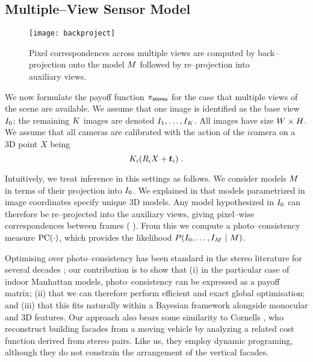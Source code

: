 \subsection{Multiple--View Sensor Model}

\begin{figure}[tb]
  \centering \texttt{[image: backproject]}
  \caption{Pixel correspondences across multiple views are computed by
    back--projection onto the model $\Scene$ followed by re--projection into
    auxiliary views.}
  \label{fig:backproject}
\end{figure}
We now formulate the payoff function $\StereoPayoff$ for the case that
multiple views of the scene are available. We assume that one
image is identified as the base view $\Image_0$; the remaining
$\NumViews$ images are denoted
$\Image_1,\ldots,\Image_{\NumViews}$. All images have size
$\Width\times\Height$. We assume that all cameras are calibrated with
the action of the $i$\th camera on a 3D point $X$ being
\begin{equation}
  \CamMatrix_i (\CamR_i X + \CamTr_i) ~.
\end{equation}

Intuitively, we treat inference in this settings as follows. We
consider models $\Scene$ in terms of their projection into
$\Image_0$. We explained in  that models parametrized in
image coordinates specify unique 3D models. Any model hypothesized in
$\Image_0$ can therefore be re--projected into the auxiliary views,
giving pixel--wise correspondences between frames (\cf
{}). From this we compute a photo--consistency
measure $\pc(\cdot)$, which provides the likelihood $P(\StereoData ~|~
\Scene)$.

Optimising over photo--consistency has been standard in the stereo
literature for several decades \cite{Scharstein01}; our contribution
is to show that (i) in the particular case of indoor Manhattan models,
photo--consistency can be expressed as a payoff matrix; (ii) that we
can therefore perform efficient and exact global optimisation; and
(iii) that this fits naturally within a Bayesian framework alongside
monocular and 3D features. Our approach also bears some similarity to
Cornells \etal \cite{Cornells2006}, who reconstruct building facades
from a moving vehicle by analyzing a related cost function derived
from stereo pairs. Like us, they employ dynamic programing, although
they do not constrain the arrangement of the vertical facades.\changedsinceviva

